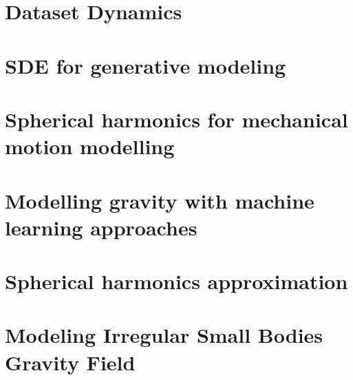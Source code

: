 \documentclass{mybook}
\begin{document}
    \clearpage
    \chapter{Dataset Dynamics}
    

    \clearpage
    \chapter{SDE for generative modeling}
    
    
    \clearpage
    \chapter{Spherical harmonics for mechanical motion modelling}
    
    
    \clearpage
    \chapter{Modelling gravity with machine learning approaches}
    

    \clearpage
    \chapter{Spherical harmonics approximation}
    
    
    \clearpage
    \chapter{Modeling Irregular Small Bodies Gravity Field}
    
    \clearpage
    \printbibliography
\end{document}
